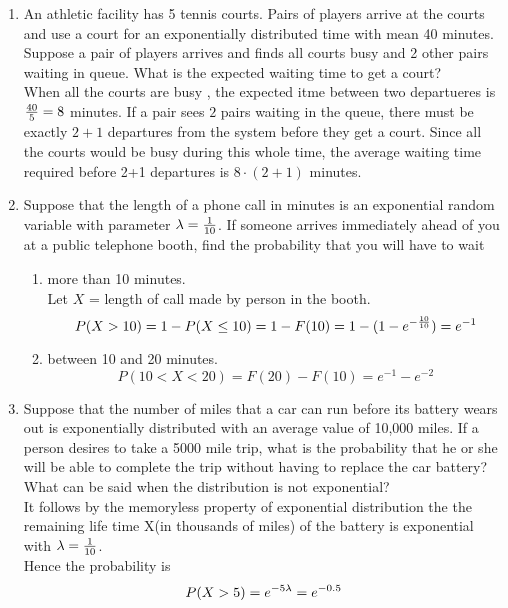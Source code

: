 \documentclass[12pt]{article}%
\newcommand{\0}{{\bf 0}}
\begin{document}
\begin{enumerate}
\item
An athletic facility has 5 tennis courts. Pairs of players arrive at the courts and use a court for an exponentially distributed time with mean 40 minutes. Suppose a pair of players arrives and finds all courts busy and 2 other pairs waiting in queue. What is the expected waiting time to get a court?
\\
{\color{blue}{\bf Sol.}}
When all the courts are busy , the expected itme between two departueres is $\frac{40}{5}=8$ minutes. If a pair sees $2$ pairs waiting in the queue, there must be exactly $2+1$ departures from the system before they get a court. Since all the courts would be busy during this whole time, the average waiting time required before 2+1 departures is $8\cdot(2+1)$ minutes.






















\item
Suppose that the length of a phone call in minutes is an exponential random variable
with parameter $\lambda=\frac{1}{10}$. If someone arrives immediately ahead of you at a public 
telephone booth, find the probability that you will have to wait
\begin{enumerate}
\item  
more than 10 minutes.
\\
{\color{blue}{\bf Sol.}}
Let $X$ = length of call made by person in the booth.
$$P(X>10)=1-P(X \le 10)=1-F(10)=1-(1-e^{-\frac{10}{10}})=e^{-1}$$


\item
between 10 and 20 minutes.
\\
{\color{blue}{\bf Sol.}}
$$P(10<X<20)=F(20)-F(10)=e^{-1}-e^{-2}$$
\end{enumerate}








\item
Suppose that the number of miles that a car can run before its battery wears out is 
exponentially distributed with an average value of 10,000 miles. If a person desires to take a 5000 mile trip, what is the probability that he or she will be able to complete the trip without having to replace the car battery? What can be said when the distribution is not exponential?
\\
{\color{blue}{\bf Sol.}}
It follows by the memoryless property of exponential distribution the the remaining life time X(in thousands of miles) of the battery is exponential with $ \lambda=\frac{1}{10}$.
\\ Hence the probability is $$P(X>5)=e^{-5 \lambda}=e^{-0.5}$$





\end{enumerate}
\end{document}
